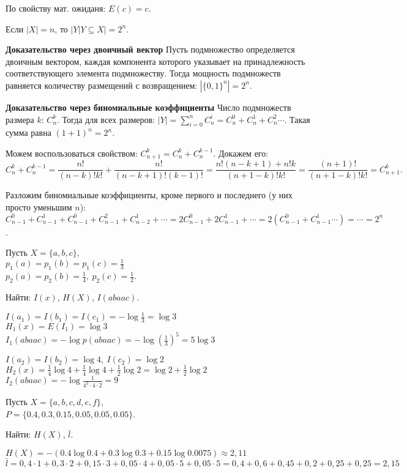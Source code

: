 По свойству мат. ожиданя: $E(c) = c$.

Если $|X| = n$, то $|{Y | Y \subseteq X}| = 2^n$.

\textbf{Доказательство через двоичный вектор} Пусть подмножество определяется двоичным вектором,
каждая компонента которого указывает на принадлежность соответствующего
элемента подмножеству. Тогда мощность подмножеств равняется количеству
размещений с возвращением: $|\{0, 1\}^n| = 2^n$.

\textbf{Доказательство через биномиальные коэффициенты} Число подмножеств
 размера $k$: $C_n^k$. Тогда для всех размеров: $|Y| = \sum_{i=0}^n C_n^i =
 C_n^0 + C_n^1 + C_n^2 \cdots$. Такая сумма равна $(1 + 1)^n = 2^n$.

Можем воспользоваться свойством: $C_{n+1}^k = C_n^k + C_n^{k-1}$. Докажем его:
\[
    C_n^k + C_n^{k - 1} = \frac{n!}{(n - k)!k!} + \frac{n!}{(n - k + 1)!(k-1)!}
    = \frac{n!(n-k+1) + n!k}{(n + 1 - k)!k!} = \frac{(n+1)!}{(n + 1 - k)!k!} =
    C^k_{n+1}.
\]

Разложим биномиальные коэффициенты, кроме первого и последнего (у них просто
уменьшим $n$): $C_{n-1}^0 +
C_{n-1}^1 + C_{n-1}^0 + C_{n-1}^2 + C_{n-2}^1 + \cdots = 2C_{n-1}^0 +
2C_{n-1}^1 + \cdots = 2(C_{n-1}^0 + C_{n-1}^1 \cdots) = \cdots = 2^n$.

Пусть $X = \{a, b, c\}$,\\
$p_1(a) = p_1(b) = p_1(c) = \frac{1}{3}$\\
$p_2(a) = p_2(b) = \frac{1}{4},\ p_2(c) = \frac{1}{2}$.

Найти: $I(x)$, $H(X)$, $I(abaac)$.

$I(a_1) = I(b_1) = I(c_1) = - \log \frac{1}{3} = \log 3$\\
$H_1(x) = E(I_1) = \log 3$\\
$I_1(abaac) = - \log p(abaac) = - \log (\frac{1}{3})^5 = 5 \log 3$

$I(a_2) = I(b_2) = \log 4,\ I(c_2) = \log 2$\\
$H_2(x) = \frac{1}{4} \log 4 + \frac{1}{4} \log 4 + \frac{1}{2} \log 2 = \log
2
+ \frac{1}{2} \log 2$\\
$I_2(abaac) = - \log \frac{1}{4^3 \cdot 4 \cdot 2} = 9$

Пусть $X = \{a, b, c, d, e, f\}$,\\
$P = \{0.4, 0.3, 0.15, 0.05, 0.05, 0.05\}$.

Найти: $H(X)$, $\bar l$. 

$H(X) = - (0.4 \log 0.4 + 0.3 \log 0.3 + 0.15 \log 0.0075) \approx 2,11$\\
$\bar l = 0,4 \cdot 1 + 0,3 \cdot 2 + 0,15 \cdot 3 + 0,05 \cdot 4 + 0,05 \cdot
5 + 0,05 \cdot 5 = 0,4 + 0,6 + 0,45 + 0,2 + 0,25 + 0,25 = 2,15$


